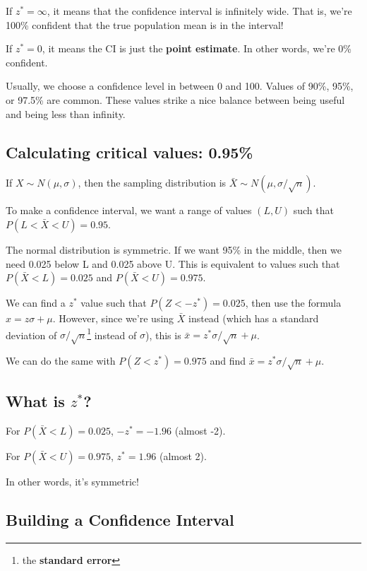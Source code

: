 \documentclass[
  letterpaper,
  DIV=11,
  numbers=noendperiod,
  oneside]{scrreprt}
\begin{document}
If \(z^* = \infty\), it means that the confidence interval is infinitely
wide. That is, we're 100\% confident that the true population mean is in
the interval!

If \(z^* = 0\), it means the CI is just the \textbf{point estimate}. In
other words, we're 0\% confident.

Usually, we choose a confidence level in between 0 and 100. Values of
90\%, 95\%, or 97.5\% are common. These values strike a nice balance
between being useful and being less than infinity.

\hypertarget{calculating-critical-values-0.95}{%
\subsection{Calculating critical values:
0.95\%}\label{calculating-critical-values-0.95}}

If \(X\sim N(\mu, \sigma)\), then the sampling distribution is
\(\bar X\sim N(\mu,\sigma/\sqrt{n})\).

To make a confidence interval, we want a range of values \((L, U)\) such
that \(P(L < \bar X < U) = 0.95\).

The normal distribution is symmetric. If we want 95\% in the middle,
then we need 0.025 below L and 0.025 above U. This is equivalent to
values such that \(P(\bar X < L) = 0.025\) and
\(P(\bar X < U) = 0.975\).

We can find a \(z^*\) value such that \(P(Z < -z^*) = 0.025\), then use
the formula \(x = z\sigma+\mu\). However, since we're using \(\bar X\)
instead (which has a standard deviation of
\(\sigma/\sqrt{n}\)\footnote{the \textbf{standard error}} instead of
\(\sigma\)), this is \(\bar x = z^*\sigma/\sqrt{n} + \mu\).

We can do the same with \(P(Z < z^*) = 0.975\) and find
\(\bar x = z^*\sigma/\sqrt n + \mu\).

\hypertarget{what-is-z}{%
\subsection{\texorpdfstring{What is
\(z^*\)?}{What is z\^{}*?}}\label{what-is-z}}

For \(P(\bar X < L) = 0.025\), \(-z^* = -1.96\) (almost -2).

For \(P(\bar X < U) = 0.975\), \(z^* = 1.96\) (almost 2).

In other words, it's symmetric!

\hypertarget{building-a-confidence-interval}{%
\subsection{Building a Confidence
Interval}\label{building-a-confidence-interval}}
\end{document}
